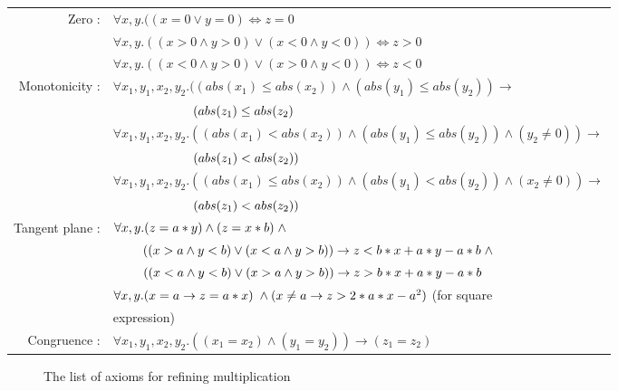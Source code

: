 \begin{table}[!ht]
\centering
\def\arraystretch{2.5}
\begin{tabular}{rl}
Zero :          & $\forall x, y. ((x = 0 \vee y = 0) \Leftrightarrow z = 0$  \\
               & $\forall x, y. ((x > 0 \wedge y > 0) \vee (x < 0 \wedge y < 0)) \Leftrightarrow z > 0$  \\
               & $\forall x, y. ((x < 0 \wedge y > 0) \vee (x > 0 \wedge y < 0)) \Leftrightarrow z < 0$  \\
Monotonicity :  & $\forall x_{1}, y_{1}, x_{2}, y_{2}. ((abs(x_{1}) \leq abs(x_{2})) \wedge (abs(y_{1}) \leq abs(y_{2})) \to$  \\
                & $\hspace{22mm}(abs(z_1) \leq abs(z_2)$  \\
                & $\forall x_{1}, y_{1}, x_{2}, y_{2}. ((abs(x_{1}) < abs(x_{2})) \wedge (abs(y_{1}) \leq abs(y_{2})) \wedge (y_{2} \neq 0)) \to$  \\
                &  $\hspace{22mm}(abs(z_1) < abs(z_2))$ \\
               & $\forall x_{1}, y_{1}, x_{2}, y_{2}. ((abs(x_{1}) \leq abs(x_{2})) \wedge (abs(y_{1}) < abs(y_{2})) \wedge (x_{2} \neq 0)) \to$ \\
               & $\hspace{22mm}(abs(z_1) < abs(z_2))$ \\
Tangent plane : & $\forall x, y. (z = a \ast y) \wedge (z = x \ast b) \hspace{1mm}\wedge$ \\
               & $\hspace{8mm}((x > a \wedge y < b) \vee (x < a \wedge y > b)) \to z < b \ast x + a \ast y - a \ast b \hspace{1mm}\wedge$ \\
               & $\hspace{8mm}((x < a \wedge y < b) \vee (x > a \wedge y > b)) \to z >  b \ast x + a \ast y - a \ast b$\\
               & $\forall x, y. (x = a \to z = a \ast x) \hspace{1mm}\wedge(x \neq a \to z > 2 \ast a \ast x - a^2)$ (for square\\
               & \hspace{8mm}expression)\\
Congruence : & $\forall x_{1}, y_{1}, x_{2}, y_{2}. ((x_1 = x_2) \wedge (y_1 = y_2)) \to (z_1 = z_2)$
\end{tabular}
\end{table}
\begin{figure}[ht!]
\caption{The list of axioms for refining multiplication}
\label{fig:List_Of_Axioms_For_Refining_Multiplication}
\end{figure}\newpage

